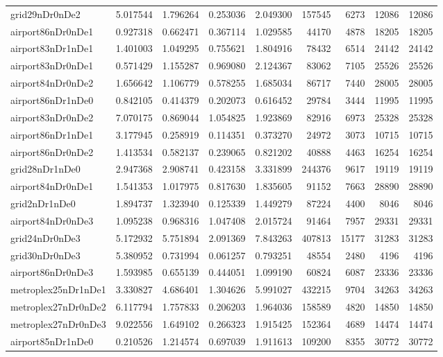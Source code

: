 \begin{longtable}{|l|r|r|r|r|r|r|r|r|}
grid29nDr0nDe2 & 5.017544 & 1.796264 & 0.253036 & 2.049300 & 157545 & 6273 & 12086 & 12086 \\
airport86nDr0nDe1 & 0.927318 & 0.662471 & 0.367114 & 1.029585 & 44170 & 4878 & 18205 & 18205 \\
airport83nDr1nDe1 & 1.401003 & 1.049295 & 0.755621 & 1.804916 & 78432 & 6514 & 24142 & 24142 \\
airport83nDr0nDe1 & 0.571429 & 1.155287 & 0.969080 & 2.124367 & 83062 & 7105 & 25526 & 25526 \\
airport84nDr0nDe2 & 1.656642 & 1.106779 & 0.578255 & 1.685034 & 86717 & 7440 & 28005 & 28005 \\
airport86nDr1nDe0 & 0.842105 & 0.414379 & 0.202073 & 0.616452 & 29784 & 3444 & 11995 & 11995 \\
airport83nDr0nDe2 & 7.070175 & 0.869044 & 1.054825 & 1.923869 & 82916 & 6973 & 25328 & 25328 \\
airport86nDr1nDe1 & 3.177945 & 0.258919 & 0.114351 & 0.373270 & 24972 & 3073 & 10715 & 10715 \\
airport86nDr0nDe2 & 1.413534 & 0.582137 & 0.239065 & 0.821202 & 40888 & 4463 & 16254 & 16254 \\
grid28nDr1nDe0 & 2.947368 & 2.908741 & 0.423158 & 3.331899 & 244376 & 9617 & 19119 & 19119 \\
airport84nDr0nDe1 & 1.541353 & 1.017975 & 0.817630 & 1.835605 & 91152 & 7663 & 28890 & 28890 \\
grid2nDr1nDe0 & 1.894737 & 1.323940 & 0.125339 & 1.449279 & 87224 & 4400 & 8046 & 8046 \\
airport84nDr0nDe3 & 1.095238 & 0.968316 & 1.047408 & 2.015724 & 91464 & 7957 & 29331 & 29331 \\
grid24nDr0nDe3 & 5.172932 & 5.751894 & 2.091369 & 7.843263 & 407813 & 15177 & 31283 & 31283 \\
grid30nDr0nDe3 & 5.380952 & 0.731994 & 0.061257 & 0.793251 & 48554 & 2480 & 4196 & 4196 \\
airport86nDr0nDe3 & 1.593985 & 0.655139 & 0.444051 & 1.099190 & 60824 & 6087 & 23336 & 23336 \\
metroplex25nDr1nDe1 & 3.330827 & 4.686401 & 1.304626 & 5.991027 & 432215 & 9704 & 34263 & 34263 \\
metroplex27nDr0nDe2 & 6.117794 & 1.757833 & 0.206203 & 1.964036 & 158589 & 4820 & 14850 & 14850 \\
metroplex27nDr0nDe3 & 9.022556 & 1.649102 & 0.266323 & 1.915425 & 152364 & 4689 & 14474 & 14474 \\
airport85nDr1nDe0 & 0.210526 & 1.214574 & 0.697039 & 1.911613 & 109200 & 8355 & 30772 & 30772 \\

\end{longtable}
